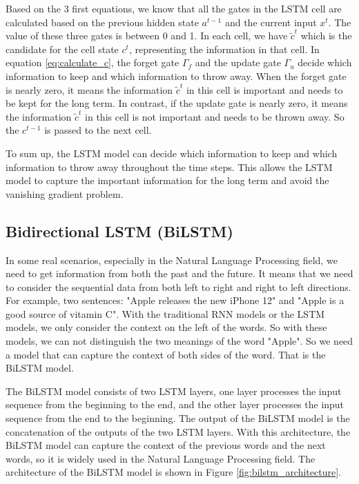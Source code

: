 Based on the 3 first equations, we know that all the gates in the LSTM cell are calculated based on the previous hidden state $a^{t-1}$ and the current input $x^{t}$. The value of these three gates is between 0 and 1. In each cell, we have $\tilde{c}^{t}$ which is the candidate for the cell state $c^{t}$, representing the information in that cell. In equation \ref{eq:calculate_c}, the forget gate $\Gamma_f$ and the update gate $\Gamma_u$ decide which information to keep and which information to throw away. When the forget gate is nearly zero, it means the information $\tilde{c}^t$ in this cell is important and needs to be kept for the long term. In contrast, if the update gate is nearly zero, it means the information $\tilde{c}^t$ in this cell is not important and needs to be thrown away. So the $c^{t-1}$ is passed to the next cell. 

To sum up, the LSTM model can decide which information to keep and which information to throw away throughout the time steps. This allows the LSTM model to capture the important information for the long term and avoid the vanishing gradient problem.

\subsection{Bidirectional LSTM (BiLSTM)}
In some real scenarios, especially in the Natural Language Processing field, we need to get information from both the past and the future. It means that we need to consider the sequential data from both left to right and right to left directions. For example, two sentences: "Apple releases the new iPhone 12" and "Apple is a good source of vitamin C". With the traditional RNN models or the LSTM models, we only consider the context on the left of the words. So with these models, we can not distinguish the two meanings of the word "Apple". So we need a model that can capture the context of both sides of the word. That is the BiLSTM model.

The BiLSTM model consists of two LSTM layers, one layer processes the input sequence from the beginning to the end, and the other layer processes the input sequence from the end to the beginning. The output of the BiLSTM model is the concatenation of the outputs of the two LSTM layers. With this architecture, the BiLSTM model can capture the context of the previous words and the next words, so it is widely used in the Natural Language Processing field. The architecture of the BiLSTM model is shown in Figure \ref{fig:bilstm_architecture}.

